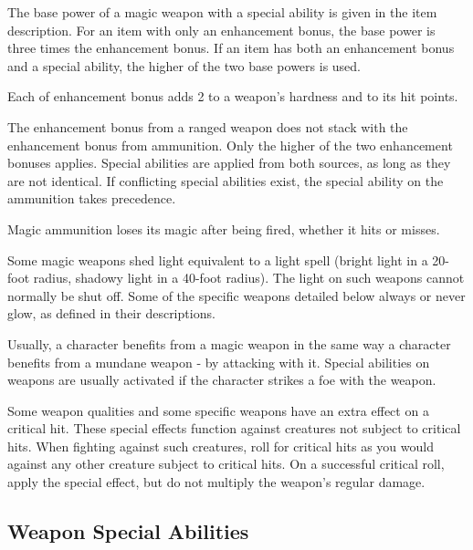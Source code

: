  The base power of a magic weapon with a special ability is given in the item description.
For an item with only an enhancement bonus, the base power is three times the enhancement bonus.
If an item has both an enhancement bonus and a special ability, the higher of the two base powers is used.

 Each  of enhancement bonus adds 2 to a weapon's hardness and  to its hit points.

 The enhancement bonus from a ranged weapon does not stack with the enhancement bonus from ammunition.
Only the higher of the two enhancement bonuses applies.
Special abilities are applied from both sources, as long as they are not identical.
If conflicting special abilities exist, the special ability on the ammunition takes precedence.

Magic ammunition loses its magic after being fired, whether it hits or misses.

 Some magic weapons shed light equivalent to a light spell (bright light in a 20-foot radius, shadowy light in a 40-foot radius).
The light on such weapons cannot normally be shut off.
Some of the specific weapons detailed below always or never glow, as defined in their descriptions.

 Usually, a character benefits from a magic weapon in the same way a character benefits from a mundane weapon - by attacking with it.
Special abilities on weapons are usually activated if the character strikes a foe with the weapon.

 Some weapon qualities and some specific weapons have an extra effect on a critical hit.
These special effects function against creatures not subject to critical hits.
When fighting against such creatures, roll for critical hits as you would against any other creature subject to critical hits.
On a successful critical roll, apply the special effect, but do not multiply the weapon's regular damage.

\subsection{Weapon Special Abilities}\label{Weapon Special Abilities}

